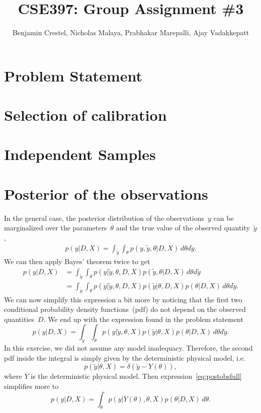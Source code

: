 \documentclass{article}
\title{\bf{CSE397: Group Assignment \#3}}
\author{Benjamin Crestel, Nicholas Malaya, Prabhakar Marepalli, Ajay Vadakkepatt}
\date{}
\begin{document}
\maketitle

\newpage
\section*{Problem Statement}

\section{Selection of calibration}

\section{Independent Samples}

\section{Posterior of the observations}
In the general case, the posterior distribution of the observations~$y$ can be marginalized over the parameters~$\theta$ and the true value of the observed quantity~$\tilde{y}$,
\begin{align*}
p( y | D, X)  = \int_{\tilde{y}} \int_\theta p(y, \tilde{y}, \theta | D, X) \, d\theta d\tilde{y} .
\end{align*}
We can then apply Bayes' theorem twice to get 
\begin{align*}
p( y | D, X) & = \int_{\tilde{y}} \int_\theta p(y | \tilde{y}, \theta , D, X) p(\tilde{y}, \theta | D, X) \, d\theta d\tilde{y}  \\
 & = \int_{\tilde{y}} \int_\theta p(y | \tilde{y}, \theta , D, X) p(\tilde{y} | \theta , D, X) p(\theta | D, X) \, d\theta d\tilde{y} .
\end{align*}
We can now simplify this expression a bit more by noticing that the first two conditional probability density functions~(pdf) do not depend on the observed quantities~$D$.
We end up with the expression found in the problem statement
\begin{equation} \label{eq:postobsfull}
 p( y | D, X)  = \int_{\tilde{y}} \int_\theta p(y | \tilde{y}, \theta , X) p(\tilde{y} | \theta , X) p(\theta | D, X) \, d\theta d\tilde{y} . 
\end{equation}
In this exercise, we did not assume any model inadequacy.
Therefore, the second pdf inside the integral is simply given by the deterministic physical model, i.e.
\[ p( \tilde{y} | \theta, X) = \delta(\tilde{y} - Y(\theta)) , \]
where $Y$ is the deterministic physical model.
Then expression~\ref{eq:postobsfull} simplifies more to
\begin{equation} \label{eq:postobs}
 p( y | D, X)  = \int_{\theta} p(y | Y(\theta), \theta , X) p(\theta | D, X) \, d\theta .
\end{equation}
\end{document}
